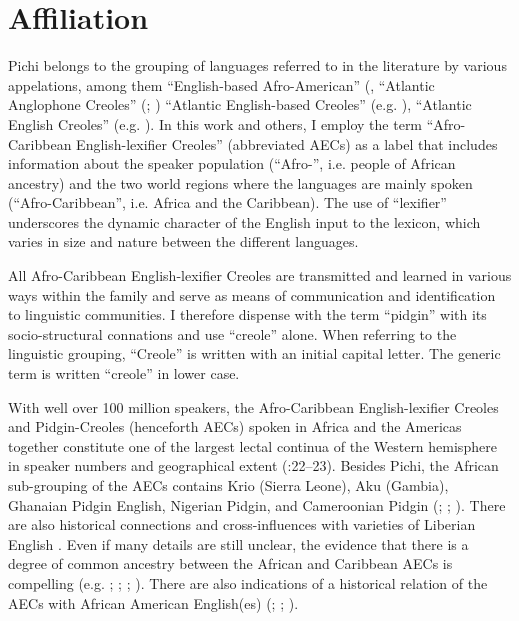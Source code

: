 \section{Affiliation}\label{sec:1.4}

Pichi belongs to the grouping of languages referred to in the literature by various appelations, among them “English-based Afro-American” (\citep{Alleyne1980}, “Atlantic Anglophone Creoles” (\citealt{Hancock1986}; \citealt{Hancock1987}) “Atlantic English-based Creoles” (e.g. \citealt{MuyskenSmith1990}), “Atlantic English Creoles” (e.g. \citealt{Baker1999}). In this work and others, I employ the term “Afro-Caribbean English-lexifier Creoles” (abbreviated AECs) \citep{Faraclas2004} as a label that includes information about the speaker population (“Afro-”, i.e. people of African ancestry) and the two world regions where the languages are mainly spoken (“Afro-Caribbean”, i.e. Africa and the Caribbean). The use of “lexifier” underscores the dynamic character of the English input to the lexicon, which varies in size and nature between the different languages. 


All Afro-Caribbean English-lexifier Creoles are transmitted and learned in various ways within the family and serve as means of communication and identification to linguistic communities. I therefore dispense with the term “pidgin” with its socio-structural connations and use “creole” alone. When referring to the linguistic grouping, “Creole” is written with an initial capital letter. The generic term is written “creole” in lower case. 



With well over 100 million speakers, the Afro-Caribbean English-lexifier Creoles and Pidgin-Creoles (henceforth AECs) spoken in Africa and the Americas together constitute one of the largest lectal continua of the Western hemisphere in speaker numbers and geographical extent (\citealt{Yakpo2016b}:22–23). Besides Pichi, the African sub-grouping of the AECs contains Krio (Sierra Leone), Aku (Gambia), Ghanaian Pidgin English, Nigerian Pidgin, and Cameroonian Pidgin (\citealt{HuberGörlach1996}; \citealt{Huber1999}; \citealt{BakerHuber2001}). There are also historical connections and cross-influences with varieties of Liberian English \citep{Singler1997}. Even if many details are still unclear, the evidence that there is a degree of common ancestry between the African and Caribbean AECs is compelling (e.g. \citealt{Hancock1986}; \citealt{Hancock1987}; \citealt{Smith1987}; \citealt{Smith2015}). There are also indications of a historical relation of the AECs with African American English(es) (\citealt{Dillard1973}; \citealt{Rickford1999}; \citealt{Winford2017}).



